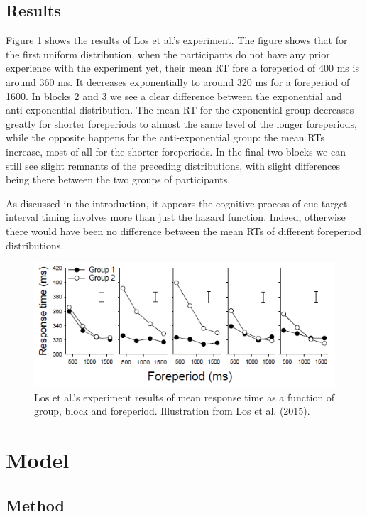 \documentclass[10pt,letterpaper]{article}
\begin{document}
\subsection{Results}
Figure \ref{LosFigure} shows the results of Los et al.'s experiment. The figure shows that for the first uniform distribution, when the participants do not have any prior experience with the experiment yet, their mean RT fore a foreperiod of 400 ms is around 360 ms. It decreases exponentially to around 320 ms for a foreperiod of 1600. In blocks 2 and 3 we see a clear difference between the exponential and anti-exponential distribution. The mean RT for the exponential group decreases greatly for shorter foreperiods to almost the same level of the longer foreperiods, while the opposite happens for the anti-exponential group: the mean RTs increase, most of all for the shorter foreperiods. In the final two blocks we can still see slight remnants of the preceding distributions, with slight differences being there between the two groups of participants.

As discussed in the introduction, it appears the cognitive process of cue target interval timing involves more than just the hazard function. Indeed, otherwise there would have been no difference between the mean RTs of different foreperiod distributions.

\begin{figure}
	\centering
	\includegraphics[width=\columnwidth]{Los1.png}
	\caption{Los et al.'s experiment results of mean response time as a function of group, block and foreperiod. Illustration from Los et al. (2015).}
	\label{LosFigure}
\end{figure}

\section{Model}
\subsection{Method}
\end{document}
